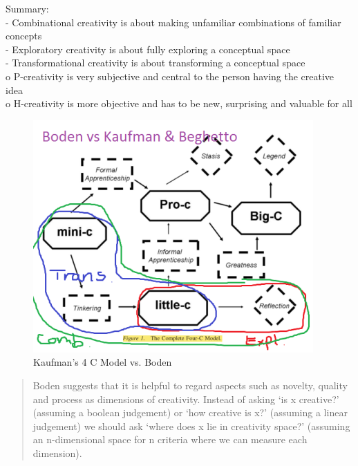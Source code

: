 \begin{shaded}
  Summary:\\
  -	Combinational creativity is about making unfamiliar combinations of familiar concepts\\
  -	Exploratory creativity is about fully exploring a conceptual space\\
  -	Transformational creativity is about transforming a conceptual space\\
  o	P-creativity is very subjective and central to the person having the creative idea\\
  o	H-creativity is more objective and has to be new, surprising and valuable for all
\end{shaded}

\begin{figure}[htb] %
  \centering
  \includegraphics[width=\linewidth]{images/4CBoden.png}
\caption[Kaufman vs Boden]{Kaufman's 4 C Model vs. Boden}
\label{fig:4CB}
\end{figure}

\begin{quote}
  Boden suggests that it is helpful to regard aspects such as novelty, quality and process as dimensions of creativity. Instead of asking ‘is x creative?’ (assuming a boolean judgement) or ‘how creative is x?’ (assuming a linear judgement) we should ask ‘where does x lie in creativity space?’ (assuming an n-dimensional space for n criteria where we can measure each dimension). \citep[p.8]{Pease2001}
\end{quote}

